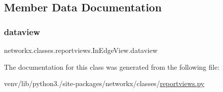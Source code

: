 \subsection{Member Data Documentation}
\mbox{\label{classnetworkx_1_1classes_1_1reportviews_1_1InEdgeView_a74d5794b64a1f963f1c9e25a307a8b80}} 
\subsubsection{\texorpdfstring{dataview}{dataview}}
{\footnotesize\ttfamily networkx.\+classes.\+reportviews.\+In\+Edge\+View.\+dataview\hspace{0.3cm}{\ttfamily [static]}}



The documentation for this class was generated from the following file\+:\begin{DoxyCompactItemize}
\item 
venv/lib/python3./site-\/packages/networkx/classes/\hyperlink{reportviews_8py}{reportviews.\+py}\end{DoxyCompactItemize}
